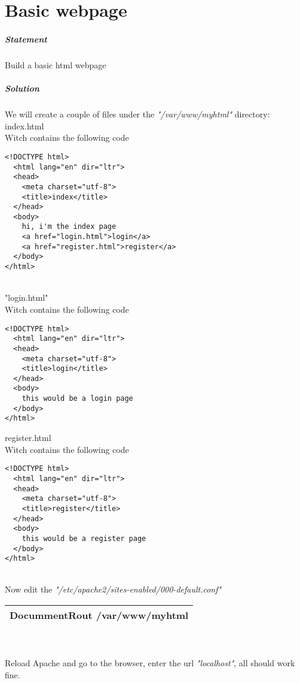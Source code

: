 \documentclass[a4paper,10pt]{article}
\newcommand\tab[1][1cm]{\hspace*{#1}}
\begin{document}
\section{Basic webpage}
\subparagraph{Statement}
Build a basic html webpage
\subparagraph{Solution}
We will create a couple of files under the {\it "/var/www/myhtml"} directory:\vspace{0.5cm}\\\tab
index.html\\Witch contains the following code
\begin{verbatim}
<!DOCTYPE html>
  <html lang="en" dir="ltr">
  <head>
    <meta charset="utf-8">
    <title>index</title>
  </head>
  <body>
    hi, i'm the index page
    <a href="login.html">login</a>
    <a href="register.html">register</a>
  </body>
</html>
\end{verbatim}
\vspace{0.5cm}\\\tab "login.html"\\Witch contains the following code
\begin{verbatim}
<!DOCTYPE html>
  <html lang="en" dir="ltr">
  <head>
    <meta charset="utf-8">
    <title>login</title>
  </head>
  <body>
    this would be a login page
  </body>
</html>
\end{verbatim}
\pagebreak
\tab register.html\\Witch contains the following code
\begin{verbatim}
<!DOCTYPE html>
  <html lang="en" dir="ltr">
  <head>
    <meta charset="utf-8">
    <title>register</title>
  </head>
  <body>
    this would be a register page
  </body>
</html>
\end{verbatim}
\vspace{0.5cm}\\
Now edit the {\it "/etc/apache2/sites-enabled/000-default.conf"}
\vspace{0.5cm}\\\begin{tabular}{|l|}\hline
DocummentRout /var/www/myhtml
\\\hline\end{tabular}\vspace{0.5cm}\\
\vspace{0.5cm}\\
Reload Apache and go to the browser, enter the url {\it "localhost"}, all should work fine.
\end{document}

